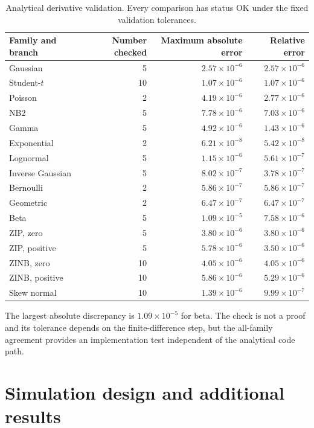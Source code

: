 \documentclass[a4paper,fleqn]{cas-sc}
\numberwithin{equation}{section}
\begin{document}
\begin{table}[t]
\centering
\caption{Analytical derivative validation. Every comparison has status OK under the fixed validation tolerances.}
\label{supp:tab:derivative-validation}
\small
\begin{tabular}{lrrr}
\toprule
Family and branch & Number checked & Maximum absolute error & Relative error\\
\midrule
Gaussian & 5 & $2.57\times10^{-6}$ & $2.57\times10^{-6}$\\
Student-$t$ & 10 & $1.07\times10^{-6}$ & $1.07\times10^{-6}$\\
Poisson & 2 & $4.19\times10^{-6}$ & $2.77\times10^{-6}$\\
NB2 & 5 & $7.78\times10^{-6}$ & $7.03\times10^{-6}$\\
Gamma & 5 & $4.92\times10^{-6}$ & $1.43\times10^{-6}$\\
Exponential & 2 & $6.21\times10^{-8}$ & $5.42\times10^{-8}$\\
Lognormal & 5 & $1.15\times10^{-6}$ & $5.61\times10^{-7}$\\
Inverse Gaussian & 5 & $8.02\times10^{-7}$ & $3.78\times10^{-7}$\\
Bernoulli & 2 & $5.86\times10^{-7}$ & $5.86\times10^{-7}$\\
Geometric & 2 & $6.47\times10^{-7}$ & $6.47\times10^{-7}$\\
Beta & 5 & $1.09\times10^{-5}$ & $7.58\times10^{-6}$\\
ZIP, zero & 5 & $3.80\times10^{-6}$ & $3.80\times10^{-6}$\\
ZIP, positive & 5 & $5.78\times10^{-6}$ & $3.50\times10^{-6}$\\
ZINB, zero & 10 & $4.05\times10^{-6}$ & $4.05\times10^{-6}$\\
ZINB, positive & 10 & $5.86\times10^{-6}$ & $5.29\times10^{-6}$\\
Skew normal & 10 & $1.39\times10^{-6}$ & $9.99\times10^{-7}$\\
\bottomrule
\end{tabular}
\end{table}

The largest absolute discrepancy is $1.09\times10^{-5}$ for beta. The check is not a proof and its tolerance depends on the finite-difference step, but the all-family agreement provides an implementation test independent of the analytical code path.

\section{Simulation design and additional results}
\label{supp:simulation}
\end{document}
